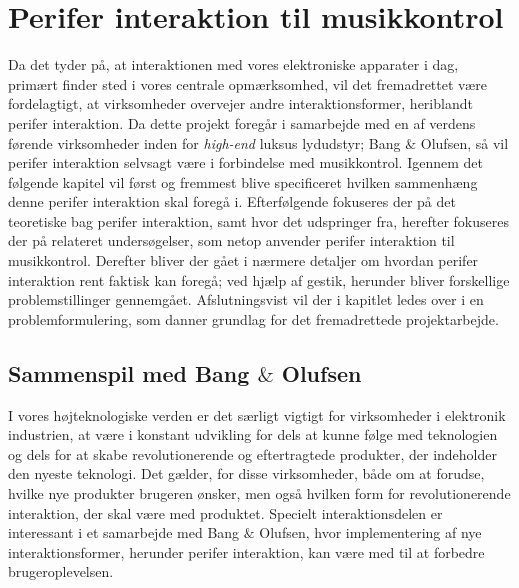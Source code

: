 \chapter{Perifer interaktion til musikkontrol}
\label{PeriferInteraktionTilMusikKontrol}
%
Da det tyder på, at interaktionen med vores elektroniske apparater i dag, primært finder sted i vores centrale opmærksomhed, vil det fremadrettet være fordelagtigt, at virksomheder overvejer andre interaktionsformer, heriblandt perifer interaktion. Da dette projekt foregår i samarbejde med en af verdens førende virksomheder inden for \textit{high-end} luksus lydudstyr; Bang $\&$ Olufsen, så vil perifer interaktion selvsagt være i forbindelse med musikkontrol. Igennem det følgende kapitel vil først og fremmest blive specificeret hvilken sammenhæng denne perifer interaktion skal foregå i. Efterfølgende fokuseres der på det teoretiske bag perifer interaktion, samt hvor det udspringer fra, herefter fokuseres der på relateret undersøgelser, som netop anvender perifer interaktion til musikkontrol. Derefter bliver der gået i nærmere detaljer om hvordan perifer interaktion rent faktisk kan foregå; ved hjælp af gestik, herunder bliver forskellige problemstillinger gennemgået. Afslutningsvist vil der i kapitlet ledes over i en problemformulering, som danner grundlag for det fremadrettede projektarbejde.    
%
\section{Sammenspil med Bang $\&$ Olufsen}
\label{SammenspilMedBO}
%
I vores højteknologiske verden er det særligt vigtigt for virksomheder i elektronik industrien, at være i konstant udvikling for dels at kunne følge med teknologien og dels for at skabe revolutionerende og eftertragtede produkter, der indeholder den nyeste teknologi. Det gælder, for disse virksomheder, både om at forudse, hvilke nye produkter brugeren ønsker, men også hvilken form for revolutionerende interaktion, der skal være med produktet. Specielt interaktionsdelen er interessant i et samarbejde med Bang $\&$ Olufsen, hvor implementering af nye interaktionsformer, herunder perifer interaktion, kan være med til at forbedre brugeroplevelsen.

